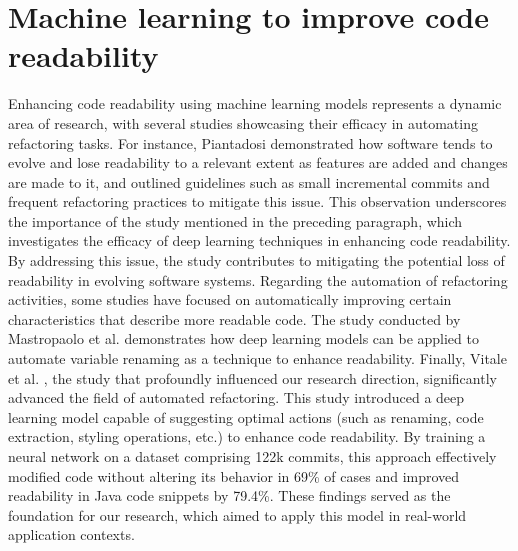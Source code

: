 \section{Machine learning to improve code readability}

Enhancing code readability using machine learning models represents a dynamic area of research, with several studies showcasing their efficacy in automating refactoring tasks. For instance, Piantadosi \cite{Piantadosi2020} demonstrated how software tends to evolve and lose readability to a relevant extent as features are added and changes are made to it, and outlined guidelines such as small incremental commits and frequent refactoring practices to mitigate this issue. This observation underscores the importance of the study mentioned in the preceding paragraph, which investigates the efficacy of deep learning techniques in enhancing code readability. By addressing this issue, the study contributes to mitigating the potential loss of readability in evolving software systems. \newline
Regarding the automation of refactoring activities, some studies have focused on automatically improving certain characteristics that describe more readable code. The study conducted by Mastropaolo et al. \cite{Mastropaolo2023} demonstrates how deep learning models can be applied to automate variable renaming as a technique to enhance readability. Finally, Vitale et al. \cite{Vitale2023}, the study that profoundly influenced our research direction, significantly advanced the field of automated refactoring. This study introduced a deep learning model capable of suggesting optimal actions (such as renaming, code extraction, styling operations, etc.) to enhance code readability. By training a neural network on a dataset comprising 122k commits, this approach effectively modified code without altering its behavior in 69\% of cases and improved readability in Java code snippets by 79.4\%. These findings served as the foundation for our research, which aimed to apply this model in real-world application contexts.




